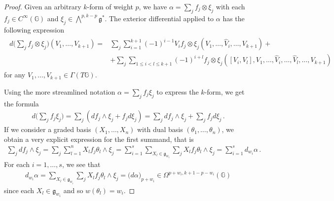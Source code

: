 \documentclass[dvipsnames]{amsart}
\theoremstyle{definition}
\theoremstyle{definition}
\numberwithin{equation}{section}
\newcommand{\G}{\mathbb{G}}
\begin{document}
\begin{proof}
    Given an arbitrary $k$-form of weight $p$, we have $\alpha=\sum_jf_j\otimes\xi_j$ with each $f_j\in C^\infty(\G)$ and $\xi_j\in\bigwedge^{p,k-p}\mathfrak{g}^\ast$. The exterior differential applied to $\alpha$ has the following expression
    \begin{align*}%
        \begin{split}
            d\bigg(\sum_jf_j\otimes\xi_j\bigg)\left(V_1,\ldots,V_{k+1}\right)=&\sum_j\sum_{i=1}^{k+1}(-1)^{i-1}V_if_j\otimes\xi_j(V_1,\ldots,\hat{V}_i,\ldots,V_{k+1})+\\&+\sum_j\sum_{1\le i<l\le k+1}(-1)^{i+l}f_j\otimes\xi_j\left([V_i,V_l],V_1,\ldots,\hat{V}_i,\ldots,\hat{V}_l,\ldots ,V_{k+1}\right)
        \end{split}
    \end{align*}   
    for any $V_1,\ldots,V_{k+1}\in\Gamma(T\G)$.

    Using the more streamlined notation $\alpha=\sum_jf_j\xi_j$ to express the $k$-form, we get the formula
    \begin{align*}
d\bigg(\sum_jf_j\xi_j\bigg)=\sum_j\left(df_j\wedge\xi_j+f_jd\xi_j\right)=\sum_jdf_j\wedge\xi_j+\sum_jf_jd\xi_j\,.
    \end{align*}
    If we consider {a graded basis $(X_1,\ldots,X_n)$} with dual basis $(\theta_1,\ldots,\theta_n)$, we obtain a very explicit expression for the first summand, that is
    \begin{align*}
        \sum_jdf_j\wedge\xi_j=\sum_j\sum_{l=1}^nX_lf_j\theta_l\wedge\xi_j=\sum_{i=1}^s\sum_{X_l\in\mathfrak{g}_{w_i}}\sum_j X_lf_j\theta_l\wedge\xi_j=\sum_{i=1}^sd_{w_i}\alpha\,.
    \end{align*}
    For each $i=1,\ldots,s$, we see that
    \begin{align*}
        d_{w_i}\alpha=\sum_{X_l\in\mathfrak{g}_{w_i}}\sum_jX_lf_j\theta_l\wedge\xi_j=\big(d\alpha\big)_{p+w_i}\in\Omega^{p+w_i,k+1-p-w_i}(\G)
    \end{align*}
    since each $X_l\in\mathfrak{g}_{w_i}$ and so $w(\theta_l)=w_i$. 


\end{proof}
\end{document}
